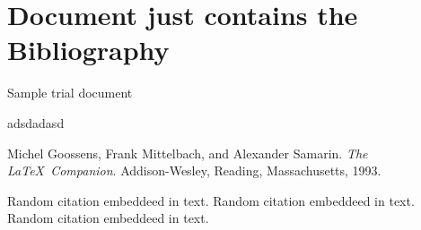 \documentclass{beamer}
\begin{document}
	\section{Document just contains the Bibliography}
	Sample trial document

	\begin{thebibliography}{9}
		adsdadasd
	\end{thebibliography}
	
	\begin{thebibliography}{9}
		Michel Goossens, Frank Mittelbach, and Alexander Samarin.
		\textit{The \LaTeX\  Companion}. 
		Addison-Wesley, Reading, Massachusetts, 1993.

	
	\end{thebibliography}
\begin{frame}
	Random citation \cite{DUMMY:1} embeddeed in text.
Random citation \cite{fummy} embeddeed in text.
Random citation \cite{yo} embeddeed in text.	
\end{frame}

	
	

	
\end{document}
